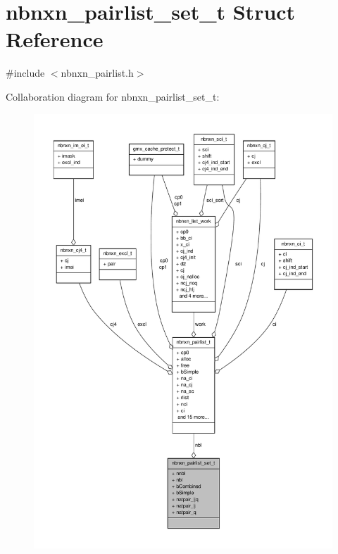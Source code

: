 \hypertarget{structnbnxn__pairlist__set__t}{\section{nbnxn\-\_\-pairlist\-\_\-set\-\_\-t \-Struct \-Reference}
\label{structnbnxn__pairlist__set__t}
}


{\ttfamily \#include $<$nbnxn\-\_\-pairlist.\-h$>$}



\-Collaboration diagram for nbnxn\-\_\-pairlist\-\_\-set\-\_\-t\-:
\nopagebreak
\begin{figure}[H]
\begin{center}
\leavevmode
\includegraphics[width=350pt]{structnbnxn__pairlist__set__t__coll__graph}
\end{center}
\end{figure}
